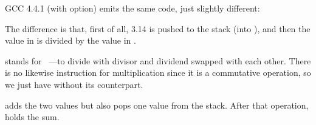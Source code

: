
GCC 4.4.1 (with \Othree option) emits the same code, just slightly different:



The difference is that, first of all, 3.14 is pushed to the stack (into ), and then the value 
in  is divided by the value in .


\FDIVR stands for ~---to divide with divisor and dividend swapped with each other. 
There is no likewise instruction for multiplication since it is 
a commutative operation, so we just have \FMUL without its  counterpart.


\FADDP adds the two values but also pops one value from the stack. 
After that operation,  holds the sum.

